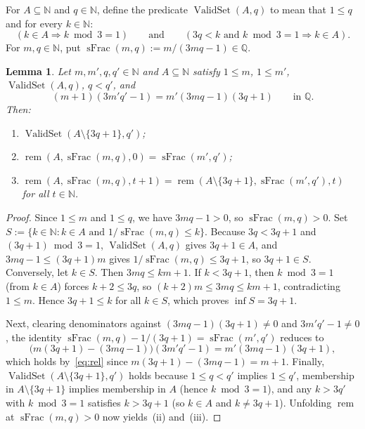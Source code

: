 \documentclass[11pt,a4paper]{amsart}
\newtheorem{lemma}{Lemma}
\newcommand{\rem}{\operatorname{rem}}
\newcommand{\ValidSet}{\operatorname{ValidSet}}
\newcommand{\sFrac}{\operatorname{sFrac}}
\begin{document}
For $A \subseteq \mathbb{N}$ and $q \in \mathbb{N}$, define the predicate $\ValidSet(A, q)$ to mean that $1 \le q$ and for every $k \in \mathbb{N}$:
\[
(k \in A \Rightarrow k \bmod 3 = 1) \qquad\text{and}\qquad (3 q < k \text{ and } k \bmod 3 = 1 \Rightarrow k \in A).
\]
For $m, q \in \mathbb{N}$, put $\sFrac(m, q) := m / (3 m q - 1) \in \mathbb{Q}$.

\begin{lemma}\label{lem:step}
Let $m, m', q, q' \in \mathbb{N}$ and $A \subseteq \mathbb{N}$ satisfy $1 \le m$, $1 \le m'$, $\ValidSet(A, q)$, $q < q'$, and
\begin{equation}\label{eq:rel}
(m + 1)(3 m' q' - 1) = m' (3 m q - 1)(3 q + 1) \qquad \text{in } \mathbb{Q}.
\end{equation}
Then:
\begin{enumerate}
\item[(i)] $\ValidSet(A \setminus \{3 q + 1\}, q')$;
\item[(ii)] $\rem(A, \sFrac(m, q), 0) = \sFrac(m', q')$;
\item[(iii)] $\rem(A, \sFrac(m, q), t + 1) = \rem(A \setminus \{3 q + 1\}, \sFrac(m', q'), t)$ for all $t \in \mathbb{N}$.
\end{enumerate}
\end{lemma}

\begin{proof}
Since $1 \le m$ and $1 \le q$, we have $3 m q - 1 > 0$, so $\sFrac(m, q) > 0$. Set $S := \{k \in \mathbb{N} : k \in A \text{ and } 1 / \sFrac(m, q) \le k\}$. Because $3 q < 3 q + 1$ and $(3 q + 1) \bmod 3 = 1$, $\ValidSet(A, q)$ gives $3 q + 1 \in A$, and $3 m q - 1 \le (3 q + 1) m$ gives $1 / \sFrac(m, q) \le 3 q + 1$, so $3 q + 1 \in S$. Conversely, let $k \in S$. Then $3 m q \le k m + 1$. If $k < 3 q + 1$, then $k \bmod 3 = 1$ (from $k \in A$) forces $k + 2 \le 3 q$, so $(k + 2) m \le 3 m q \le k m + 1$, contradicting $1 \le m$. Hence $3 q + 1 \le k$ for all $k \in S$, which proves $\inf S = 3 q + 1$.

Next, clearing denominators against $(3 m q - 1)(3 q + 1) \ne 0$ and $3 m' q' - 1 \ne 0$, the identity $\sFrac(m, q) - 1 / (3 q + 1) = \sFrac(m', q')$ reduces to
\[
\bigl(m (3 q + 1) - (3 m q - 1)\bigr)(3 m' q' - 1) = m' (3 m q - 1)(3 q + 1),
\]
which holds by~\eqref{eq:rel} since $m (3 q + 1) - (3 m q - 1) = m + 1$. Finally, $\ValidSet(A \setminus \{3 q + 1\}, q')$ holds because $1 \le q < q'$ implies $1 \le q'$, membership in $A \setminus \{3 q + 1\}$ implies membership in $A$ (hence $k \bmod 3 = 1$), and any $k > 3 q'$ with $k \bmod 3 = 1$ satisfies $k > 3 q + 1$ (so $k \in A$ and $k \ne 3 q + 1$). Unfolding $\rem$ at $\sFrac(m, q) > 0$ now yields~(ii) and~(iii).
\end{proof}
\end{document}
